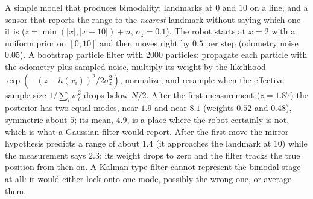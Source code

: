 \begin{solutions}
  \item A simple model that produces bimodality: landmarks at $0$ and $10$ on a line, and a sensor that reports the range to the \emph{nearest} landmark
        without saying which one it is ($z = \min(|x|, |x - 10|) + n$, $\sigma_z = 0.1$). The robot starts at $x = 2$ with a uniform prior on $[0, 10]$ and
        then moves right by $0.5$ per step (odometry noise $0.05$). A bootstrap particle filter with 2000 particles: propagate each particle with the
        odometry plus sampled noise, multiply its weight by the likelihood $\exp(-(z - h(x_i))^2/2\sigma_z^2)$, normalize, and resample when the effective
        sample size $1/\sum_iw_i^2$ drops below $N/2$. After the first measurement ($z = 1.87$) the posterior has two equal modes, near $1.9$ and near $8.1$
        (weights $0.52$ and $0.48$), symmetric about $5$; its mean, $4.9$, is a place where the robot certainly is not, which is what a Gaussian filter
        would report. After the first move the mirror hypothesis predicts a range of about $1.4$ (it approaches the landmark at 10) while the
        measurement says $2.3$; its weight drops to zero and the filter tracks the true position from then on. A Kalman-type filter cannot represent
        the bimodal stage at all: it would either lock onto one mode, possibly the wrong one, or average them.
\end{solutions}
